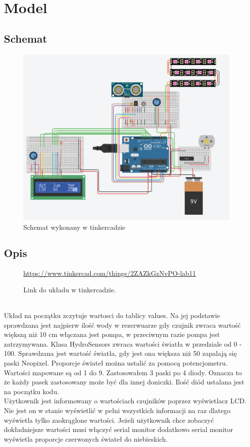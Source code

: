 \documentclass[a4paper,11pt]{uzreport}
\begin{document}
\section{Model}
\subsection{Schemat}
\begin{figure}[!h]
    \centering
    \includegraphics[width=\linewidth]{listings/zad1.png}
    \caption{Schemat wykonany w tinkercadzie}
    \label{fig:my_label}
\end{figure}
\clearpage
\subsection{Opis}
\begin{figure}
    \centering
      \href{https://www.tinkercad.com/things/2ZAZkGzNvPO-lab11}{https://www.tinkercad.com/things/2ZAZkGzNvPO-lab11}
    \captionsetup{labelformat=empty}
    \caption{Link do układu w tinkercadzie.}
    \label{fig:link}
\end{figure}
    \\
    Układ na początku zczytuje wartosci do tablicy values. Na jej podstawie sprawdzana jest najpierw ilość wody w rezerwuarze gdy czujnik zwraca wartość większą niż 10 cm włączana jest pompa, w przeciwnym razie pompa jest zatrzymywana. Klasa HydroSensors zwraca wartości światła w przedziale od 0 - 100. Sprawdzana jest wartość światła, gdy jest ona większa niż 50 zapalają się paski Neopixel. 
Proporcje świateł można ustalić za pomocą potencjometru. Wartości mapowane są od 1 do 9. Zastosowałem 3 paski po 4 diody. Oznacza to że każdy pasek zastosowany może być dla innej doniczki. Ilość diód ustalana jest na początku kodu.\\
Użytkownik jest informowany o wartościach czujników poprzez wyświetlacz LCD. Nie jest on w stanie wyświetlić w pełni wszystkich informacji na raz dlatego wyświetla tylko zaokrąglone wartości. Jeżeli użytkownik chce zobaczyć dokładniejsze wartości musi włączyć serial monitor dodatkowo serial monitor wyświetla proporcje czerwonych świateł do niebieskich.\\
\end{document}
